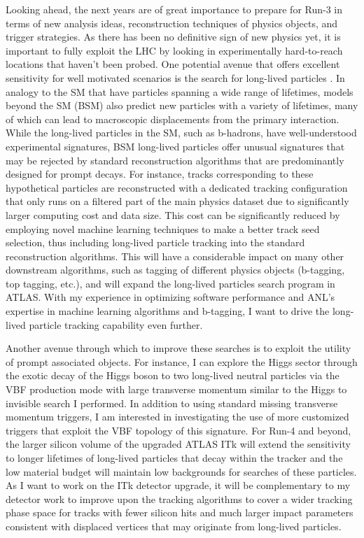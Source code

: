\documentclass[a4paper]{article}
\begin{document}
Looking ahead, the next years are of great importance to prepare for Run-3 in terms of new analysis ideas, reconstruction techniques of physics objects, and trigger strategies. As there has been no definitive sign of new physics yet,
it is important to fully exploit the LHC by looking in experimentally hard-to-reach locations that haven't been probed.
One potential avenue that offers excellent sensitivity for well motivated scenarios is the search for long-lived particles
\cite{alimena2019searching}.
In analogy to the SM that have particles spanning a wide range of lifetimes, models beyond the SM (BSM) also predict new particles
with a variety of lifetimes, many of which can lead to macroscopic displacements from the primary interaction.
While the long-lived particles in the SM, such as b-hadrons, have well-understood experimental signatures, BSM long-lived particles
offer unusual signatures that may be rejected by standard reconstruction algorithms that are predominantly designed for prompt decays.
For instance, tracks corresponding to these hypothetical particles are reconstructed with a dedicated tracking configuration that only runs
on a filtered part of the main physics dataset due to significantly larger computing cost and data size. This cost can be significantly reduced
by employing novel machine learning techniques to make a better track seed selection, thus including long-lived particle tracking
into the standard reconstruction algorithms. This will have a considerable impact on many other downstream algorithms, such as tagging of different
physics objects (b-tagging, top tagging, etc.), and will expand the long-lived particles search program in ATLAS.
With my experience in optimizing software performance and ANL's expertise in machine learning algorithms and b-tagging,
I want to drive the long-lived particle tracking capability even further.

Another avenue through which to improve these searches is to exploit the utility of prompt associated objects.
For instance, I can explore the Higgs sector through the exotic decay of the Higgs boson to two long-lived neutral particles via the VBF production mode with large transverse momentum similar to the Higgs to invisible search I performed. In addition to using standard missing transverse momentum triggers, I am interested in investigating the use of more customized triggers that exploit the VBF topology of this signature.
For Run-4 and beyond, the larger silicon volume of the upgraded ATLAS ITk will extend the sensitivity to longer lifetimes of long-lived particles that decay within the tracker and the low material budget will maintain low backgrounds for searches of these particles\cite{HLLHC_vertex}.
As I want to work on the ITk detector upgrade, it will be complementary to my detector work to improve upon the tracking algorithms to cover a wider tracking phase space for tracks with fewer silicon hits and much larger impact parameters consistent with displaced vertices that may originate from long-lived particles.
\end{document}
